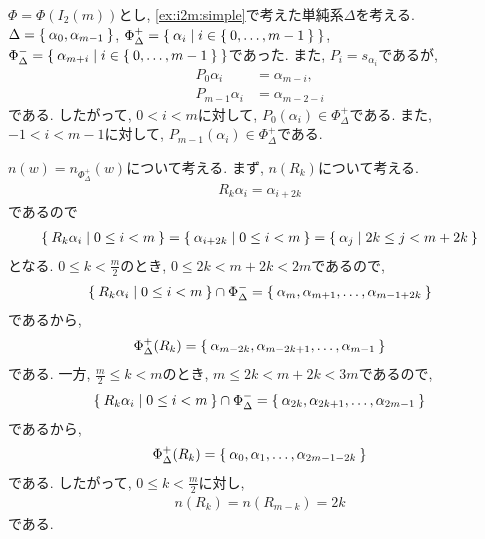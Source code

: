 $\Phi=\Phi(I_2(m))$とし,
\cref{ex:i2m:simple}で考えた単純系$\Delta$を考える.
$\Delta=\Set{\alpha_0,\alpha_{m-1}}$,
$\Phi_\Delta^+=\Set{\alpha_i|i\in\Set{0,\ldots,m-1}}$,
$\Phi_\Delta^-=\Set{\alpha_{m+i}|i\in\Set{0,\ldots,m-1}}$であった.
また, $P_i=s_{\alpha_{i}}$であるが,
\begin{align*}
P_0\alpha_i&=\alpha_{m-i},\\
P_{m-1}\alpha_i&=\alpha_{m-2-i}
\end{align*}
である.
したがって,
$0<i<m$に対して,
$P_0(\alpha_i)\in\Phi_\Delta^+$である.
また, $-1<i<m-1$に対して,
$P_{m-1}(\alpha_i)\in\Phi_\Delta^+$である.

$n(w)=n_{\Phi_\Delta^+}(w)$について考える.
まず, $n(R_k)$について考える.
\begin{align*}
  R_k\alpha_i=\alpha_{i+2k}
\end{align*}
であるので
\begin{align*}
\Set{R_k\alpha_i|0\leq i < m}=\Set{\alpha_{i+2k}|0\leq i < m}=\Set{\alpha_{j}|2k \leq j < m+2k}
\end{align*}
となる.
$0\leq k <\frac{m}{2}$のとき, $0\leq 2k<m+2k<2m$であるので,
\begin{align*}
  \Set{R_k\alpha_i|0\leq i < m}\cap \Phi_\Delta^-=\Set{\alpha_m,\alpha_{m+1},\ldots,\alpha_{m-1+2k}}
\end{align*}
であるから,
\begin{align*}
  \Phi_\Delta^+(R_k)=\Set{\alpha_{m-2k},\alpha_{m-2k+1},\ldots,\alpha_{m-1}}
\end{align*}
である.
一方,
$\frac{m}{2}\leq k <m$のとき, $m\leq 2k<m+2k<3m$であるので,
\begin{align*}
  \Set{R_k\alpha_i|0\leq i < m}\cap \Phi_\Delta^-=\Set{\alpha_{2k},\alpha_{2k+1},\ldots,\alpha_{2m-1}}
\end{align*}
であるから,
\begin{align*}
  \Phi_\Delta^+(R_k)=\Set{\alpha_{0},\alpha_{1},\ldots,\alpha_{2m-1-2k}}
\end{align*}
である.
したがって, $0\leq k <\frac{m}{2}$に対し,
\begin{align*}
  n(R_{k})=n(R_{m-k})=2k 
\end{align*}
である.


